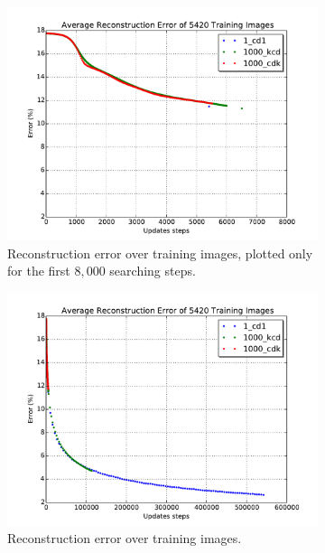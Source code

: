 \begin{figure}[hbt]
  \centering
		\begin{subfigure}[t]{0.4\textwidth}
			\includegraphics[width=\textwidth]{pics_sdbn/train_short.pdf}
		    \caption{Reconstruction error over training images, plotted only for the first $8,000$ searching steps.}
		\end{subfigure}
		\begin{subfigure}[t]{0.4\textwidth}
			\includegraphics[width=\textwidth]{pics_sdbn/train_long.pdf}
		    \caption{Reconstruction error over training images.}
		\end{subfigure}\\
		\begin{subfigure}[t]{0.4\textwidth}

\end{subfigure}
\end{figure}
